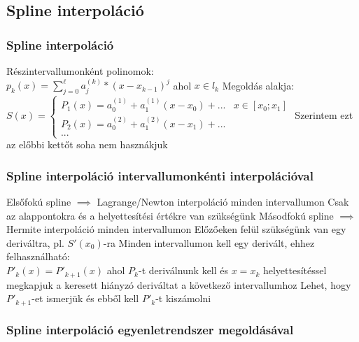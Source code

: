 \documentclass[12pt,a4paper]{article}
\begin{document}
\pagebreak

\subsection{Spline interpoláció}

\subsubsection{Spline interpoláció}

\begin{outline}
	\1 Részintervallumonként polinomok:\\
	$p_k(x) = \sum_{j=0}^\ell a_j^{(k)} * (x - x_{k-1})^j$ ahol $x \in l_k$
	\1 Megoldás alakja: $S(x) = \begin{cases}
		P_1(x) = a_0^{(1)} + a_1^{(1)}(x-x_0) + ... & x \in [x_0;x_1] \\
		P_2(x) = a_0^{(2)} + a_1^{(2)}(x-x_1) + ... \\
		...
	\end{cases}$
	\1 Szerintem ezt az előbbi kettőt soha nem hasznákjuk
\end{outline}

\subsubsection{Spline interpoláció intervallumonkénti interpolációval}

\begin{outline}	
	\1 Elsőfokú spline $\implies$ Lagrange/Newton interpoláció minden intervallumon
		\2 Csak az alappontokra és a helyettesítési értékre van szükségünk
	\1 Másodfokú spline $\implies$ Hermite interpoláció minden intervallumon
		\2 Előzőeken felül szükségünk van egy deriváltra, pl. $S'(x_0)$-ra
		\2 Minden intervallumon kell egy derivált, ehhez felhasználható:\\
		$P'_k(x) = P'_{k+1}(x)$ ahol $P_k$-t deriválnunk kell és $x=x_k$ helyettesítéssel megkapjuk a keresett hiányzó deriváltat a következő intervallumhoz
			\3 Lehet, hogy $P'_{k+1}$-et ismerjük és ebből kell $P'_k$-t kiszámolni
\end{outline}

\pagebreak

\subsubsection{Spline interpoláció egyenletrendszer megoldásával}
\end{document}
